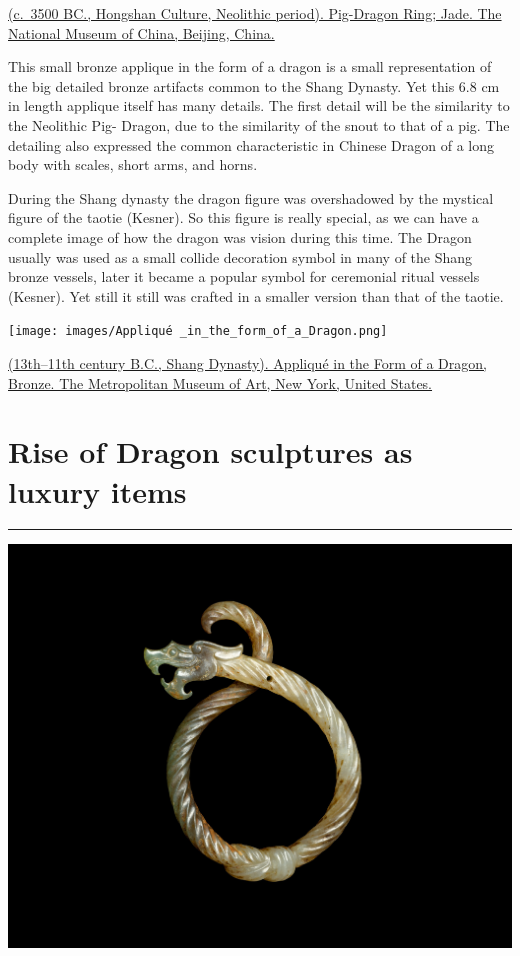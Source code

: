 \documentclass[
]{book}
\begin{document}
\href{}{(c.~3500 BC., Hongshan Culture, Neolithic period). Pig-Dragon Ring; Jade. The National Museum of China, Beijing, China.}

This small bronze applique in the form of a dragon is a small representation of the big detailed bronze artifacts common to the Shang Dynasty. Yet this 6.8 cm in length applique itself has many details. The first detail will be the similarity to the Neolithic Pig- Dragon, due to the similarity of the snout to that of a pig. The detailing also expressed the common characteristic in Chinese Dragon of a long body with scales, short arms, and horns.

During the Shang dynasty the dragon figure was overshadowed by the mystical figure of the taotie (Kesner). So this figure is really special, as we can have a complete image of how the dragon was vision during this time. The Dragon usually was used as a small collide decoration symbol in many of the Shang bronze vessels, later it became a popular symbol for ceremonial ritual vessels (Kesner). Yet still it still was crafted in a smaller version than that of the taotie.

\texttt{[image: images/Appliqué \_in\_the\_form\_of\_a\_Dragon.png]}

\href{https://www.metmuseum.org/art/collection/search/49505}{(13th--11th century B.C., Shang Dynasty). Appliqué in the Form of a Dragon, Bronze. The Metropolitan Museum of Art, New York, United States.}

\hypertarget{zhou_han}{%
\chapter*{Rise of Dragon sculptures as luxury items}\label{zhou_han}}

\begin{center}\rule{0.5\linewidth}{0.5pt}\end{center}

\includegraphics{images/knotted_dragon.jpg}
\end{document}
